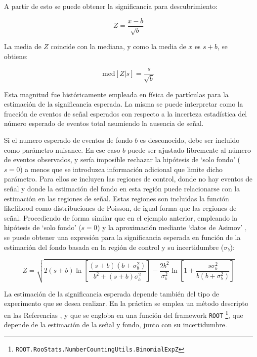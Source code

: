 A partir de esto se puede obtener la significancia para descubrimiento:

\begin{equation}
	Z = \frac{x-b}{\sqrt{b}}
\end{equation}

La media de $Z$ coincide con la mediana, y como la media de $x$ es $s+b$, se obtiene:

\begin{equation}
	\text{med}[Z|s] = \frac{s}{\sqrt{b}}
\end{equation}

Esta magnitud fue históricamente empleada en física de partículas para la estimación de la significancia esperada. La misma se puede interpretar como la fracción de eventos de señal esperados con respecto a la incerteza estadística del número esperado de eventos total asumiendo la ausencia de señal.

Si el numero esperado de eventos de fondo $b$ es desconocido, debe ser incluido como parámetro nuisance. En ese caso $b$ puede ser ajustado libremente al número de eventos observados, y sería imposible rechazar la hipótesis de `solo fondo' ($s=0$) a menos que se introduzca información adicional que limite dicho parámetro. Para ellos se incluyen las regiones de control, donde no hay eventos de señal y donde la estimación del fondo en esta región puede relacionarse con la estimación en las regiones de señal. Estas regiones son incluidas la función likelihood como distribuciones de Poisson, de igual forma que las regiones de señal. Procediendo de forma similar que en el ejemplo anterior, empleando la  hipótesis de `solo fondo' ($s=0$) y la aproximación mediante `datos de Asimov' \cite{Cowan:2010js}, se puede obtener una expresión para la significancia esperada en función de la estimación del fondo basada en la región de control y su incertidumbre ($\sigma_b$):

\begin{equation}
	Z = \sqrt{ 2 (s+b) \ln{\left[ \frac{(s+b)(b+\sigma_b^2)}{b^2 + (s+b)\sigma_b^2} \right]} - \frac{2 b^2}{\sigma_b^2} \ln{ \left[ 1 + \frac{s \sigma_b^2}{b(b+\sigma_b^2)} \right] } }
\end{equation}

La estimación de la significancia esperada depende también del tipo de experimento que se desea realizar. En la práctica se emplea un método descripto en las Referencias \cite{Linnemann:2003vw, stat_1, ATL-PHYS-PUB-2020-025}, y que se engloba en una función del framework \texttt{ROOT} \footnote{\texttt{ROOT.RooStats.NumberCountingUtils.BinomialExpZ}}, que depende de la estimación de la señal y fondo, junto con su incertidumbre. 

